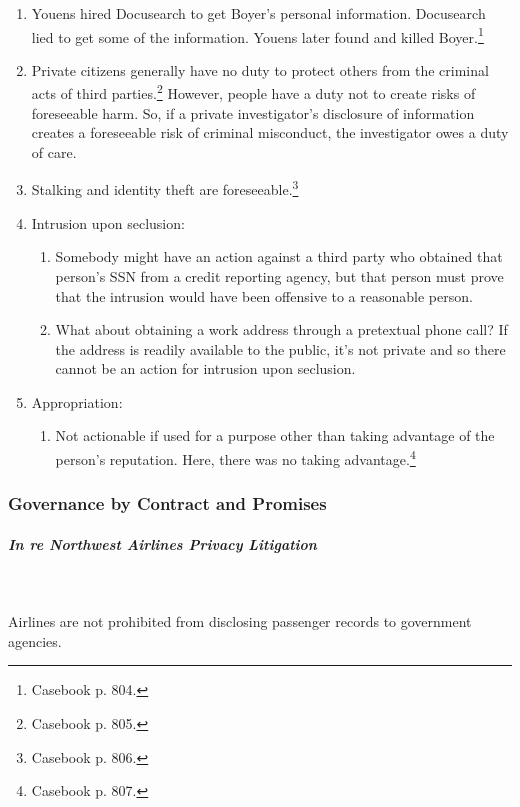 \begin{enumerate}
    \item Youens hired Docusearch to get Boyer's personal information. 
    Docusearch lied to get some of the information. Youens later found and 
    killed Boyer.\footnote{Casebook p. 804.}
    \item Private citizens generally have no duty to protect others from the 
    criminal acts of third parties.\footnote{Casebook p. 805.} However, people 
    have a duty not to create risks of foreseeable harm. So, if a private 
    investigator's disclosure of information creates a foreseeable risk of 
    criminal misconduct, the investigator owes a duty of care.
    \item Stalking and identity theft are foreseeable.\footnote{Casebook p. 
    806.}
    \item Intrusion upon seclusion:
    \begin{enumerate}
        \item Somebody might have an action against a third party who obtained 
        that person's SSN from a credit reporting agency, but that person must 
        prove that the intrusion would have been offensive to a reasonable 
        person.
        \item What about obtaining a work address through a pretextual phone 
        call? If the address is readily available to the public, it's not 
        private and so there cannot be an action for intrusion upon seclusion.
    \end{enumerate}
    \item Appropriation:
    \begin{enumerate}
        \item Not actionable if used for a purpose other than taking advantage 
        of the person's reputation. Here, there was no taking 
        advantage.\footnote{Casebook p. 807.}
    \end{enumerate}
\end{enumerate}

\subsubsection{Governance by Contract and Promises}

\paragraph{\emph{In re Northwest Airlines Privacy Litigation}}
~\\\\
Airlines are not prohibited from disclosing passenger records to government 
agencies.

